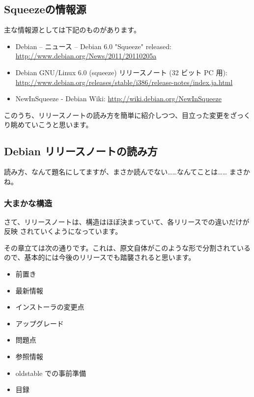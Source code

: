\documentclass[mingoth,a4paper]{jsarticle}
\begin{document}
\subsection{Squeezeの情報源}

主な情報源としては下記のものがあります。

\begin{itemize}
 \item Debian -- ニュース -- Debian 6.0 "Squeeze" released:
       \url{http://www.debian.org/News/2011/20110205a}
 \item Debian GNU/Linux 6.0 (squeeze) リリースノート (32 ビット PC 用):
       \url{http://www.debian.org/releases/stable/i386/release-notes/index.ja.html}
 \item NewInSqueeze - Debian Wiki: \url{http://wiki.debian.org/NewInSqueeze}

\end{itemize}

このうち、リリースノートの読み方を簡単に紹介しつつ、目立った変更をざっく
り眺めていこうと思います。


\subsection{Debian リリースノートの読み方}

読み方、なんて題名にしてますが、まさか読んでない……なんてことは……
まさかね。

\subsubsection{大まかな構造}

さて、リリースノートは、構造はほぼ決まっていて、各リリースでの違いだけが反映
されていくようになっています。


その章立ては次の通りです。これは、原文自体がこのような形で分割されている
ので、基本的には今後のリリースでも踏襲されると思います。

\begin{itemize}
 \item 前置き
 \item 最新情報
 \item インストーラの変更点
 \item アップグレード
 \item 問題点
 \item 参照情報
 \item oldstable での事前準備
 \item 目録
\end{itemize}
\end{document}
